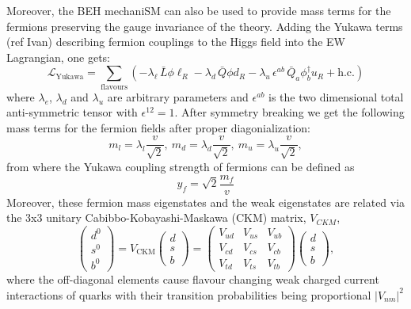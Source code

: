 \documentclass[11pt,twoside]{book}
\begin{document}
Moreover, the BEH mechani\acrshort{SM} can also be used to provide mass terms for the fermions preserving the gauge invariance of the theory.
Adding the Yukawa terms (ref Ivan) describing fermion couplings to the Higgs field into the EW Lagrangian, one gets:
\begin{equation}
\mathcal{L}_{\text{Yukawa}} = 
\sum_{\text{flavours}} \left( 
- \lambda_\ell \, \bar{L} \phi \ell_R 
- \lambda_d \, \bar{Q} \phi d_R 
- \lambda_u \, \epsilon^{ab} \, \bar{Q}_a \phi_b^{\dagger} u_R 
+ \text{h.c.} 
\right)
\end{equation}
where $\lambda_{e}$, $\lambda_{d}$ and $\lambda_{u}$ are arbitrary parameters and $\epsilon^{ab}$ is the two dimensional total anti-symmetric tensor with $\epsilon^{12}=1$. After symmetry breaking we get the following mass terms for the fermion fields after proper diagonialization: 
\begin{equation}
m_{l}=\lambda_{l}\frac{v}{\sqrt{2}}, \ m_{d}=\lambda_{d}\frac{v}{\sqrt{2}}, \ m_{u}=\lambda_{u}\frac{v}{\sqrt{2}},
\end{equation}
from where the Yukawa coupling strength of fermions can be defined as
\begin{equation}
\label{yukawa}
y_{f}=\sqrt{2}\frac{m_{f}}{v}
\end{equation}
Moreover, these fermion mass eigenstates and the weak eigenstates are related via the 3x3 unitary Cabibbo-Kobayashi-Maskawa (CKM) matrix, $V_{CKM}$,
\begin{equation}
\begin{pmatrix}
d^0 \\
s^0 \\
b^0
\end{pmatrix}
= V_{\text{CKM}}
\begin{pmatrix}
d \\
s \\
b
\end{pmatrix}
=\begin{pmatrix}
V_{ud} & V_{us} & V_{ub} \\
V_{cd} & V_{cs} & V_{cb} \\
V_{td} & V_{ts} & V_{tb}
\end{pmatrix}
\begin{pmatrix}
d \\
s \\
b
\end{pmatrix},
\end{equation}
where the off-diagonal elements cause flavour changing weak charged current interactions of quarks with their transition probabilities being proportional $|V_{nm}|^2$
\end{document}
